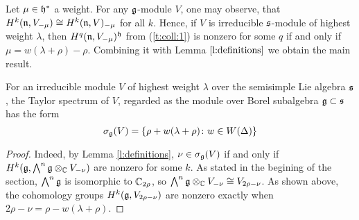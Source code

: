 Let $\mu \in \mathfrak{h}^*$ a weight. For any $\mathfrak{g}$-module $V$, one may observe, that $H^k(\mathfrak{n},
V_{-\mu}) \cong H^k(\mathfrak{n}, V)_{-\mu}$ for all $k$. Hence, if $V$ is irreducible $\mathfrak{s}$-module of
highest weight $\lambda$, then $H^q(\mathfrak{n}, V_{-\mu})^{\mathfrak{h}}$ from (\ref{t:coll:1}) is nonzero for
some $q$ if and only if $\mu = w(\lambda + \rho) - \rho$. Combining it with Lemma
$\ref{l:definitions}$ we obtain the main result.
\begin{theorem}
   For an irreducible module $V$ of highest weight $\lambda$ over the semisimple Lie algebra
   $\mathfrak{s}$, the Taylor spectrum of $V$, regarded as the module over Borel subalgebra $\mathfrak{g} \subset
   \mathfrak{s}$ has the form 
   \[
       \sigma_{\mathfrak{g}}(V) = \{ \rho + w(\lambda + \rho)\colon w \in W(\Delta)\}
   \]
\end{theorem}
\begin{proof}
    Indeed, by Lemma \ref{l:definitions}, $\nu \in \sigma_{\mathfrak{g}}(V)$ if and only if $H^k(\mathfrak{g},
    \bigwedge^n\mathfrak{g} \otimes_{\mathbb{C}} V_{-\nu})$ are nonzero for some $k$. As stated in the begining of
    the section, $\bigwedge^n \mathfrak{g}$ is isomorphic to $\mathbb{C}_{2\rho}$, so $\bigwedge^n\mathfrak{g}
    \otimes_{\mathbb{C}} V_{-\nu} \cong V_{2\rho - \nu}$. As shown above, the cohomology groups $H^k(\mathfrak{g},
    V_{2\rho - \nu})$ are nonzero exactly when $2\rho - \nu = \rho - w(\lambda + \rho)$.
\end{proof}
